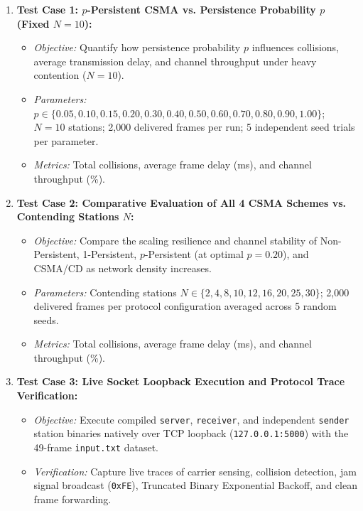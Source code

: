 \documentclass[11pt,a4paper]{article}
\begin{document}
\begin{enumerate}
    \item \textbf{Test Case 1: $p$-Persistent CSMA vs. Persistence Probability $p$ (Fixed $N = 10$):}
    \begin{itemize}
        \item \textit{Objective:} Quantify how persistence probability $p$ influences collisions, average transmission delay, and channel throughput under heavy contention ($N = 10$).
        \item \textit{Parameters:} $p \in \{0.05, 0.10, 0.15, 0.20, 0.30, 0.40, 0.50, 0.60, 0.70, 0.80, 0.90, 1.00\}$; $N = 10$ stations; 2,000 delivered frames per run; 5 independent seed trials per parameter.
        \item \textit{Metrics:} Total collisions, average frame delay (ms), and channel throughput (\%).
    \end{itemize}

    \item \textbf{Test Case 2: Comparative Evaluation of All 4 CSMA Schemes vs. Contending Stations $N$:}
    \begin{itemize}
        \item \textit{Objective:} Compare the scaling resilience and channel stability of Non-Persistent, 1-Persistent, $p$-Persistent (at optimal $p = 0.20$), and CSMA/CD as network density increases.
        \item \textit{Parameters:} Contending stations $N \in \{2, 4, 8, 10, 12, 16, 20, 25, 30\}$; 2,000 delivered frames per protocol configuration averaged across 5 random seeds.
        \item \textit{Metrics:} Total collisions, average frame delay (ms), and channel throughput (\%).
    \end{itemize}

    \item \textbf{Test Case 3: Live Socket Loopback Execution and Protocol Trace Verification:}
    \begin{itemize}
        \item \textit{Objective:} Execute compiled \texttt{server}, \texttt{receiver}, and independent \texttt{sender} station binaries natively over TCP loopback (\texttt{127.0.0.1:5000}) with the 49-frame \texttt{input.txt} dataset.
        \item \textit{Verification:} Capture live traces of carrier sensing, collision detection, jam signal broadcast (\texttt{0xFE}), Truncated Binary Exponential Backoff, and clean frame forwarding.
    \end{itemize}
\end{enumerate}
\end{document}
